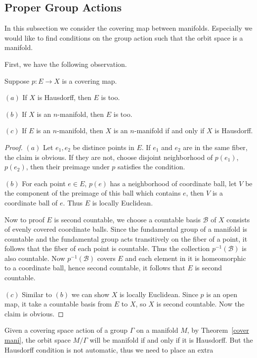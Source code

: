 \subsection{Proper Group Actions}
In this subsection we consider the covering map between manifolds. Especially 
we would like to find conditions on the group action such that the orbit space 
is a manifold.\par
First, we have the following observation.
\begin{theorem}\label{cover mani}
Suppose $p:E\to X$ is a covering map.
\item[$(a)$]If $X$ is Hausdorff, then $E$ is too.
\item[$(b)$]If $X$ is an $n$-manifold, then $E$ is too.
\item[$(c)$]If $E$ is an $n$-manifold, then $X$ is an $n$-manifold if and only if $X$ is Hausdorff.
\end{theorem}
\begin{proof}
$(a)$ Let $e_1,e_2$ be distince points in $E$. If $e_1$ and $e_2$ are in the same fiber, the claim is obvious. If they are not, choose disjoint neighborhood of $p(e_1)$, $p(e_2)$, then their preimage under $p$ satisfies the condition.\par
$(b)$ For each point $e\in E$, $p(e)$ has a neighborhood of coordinate ball, let $V$ be the component of the preimage of this ball which contains $e$, then $V$ is a coordinate ball of $e$. Thus $E$ is locally Euclidean.\par 
Now to proof $E$ is second countable, we choose a countable basis $\mathcal{B}$ of $X$ consists of evenly covered coordinate balls. Since the fundamental group of a manifold is countable and the fundamental group acts transitively on the fiber of a point, it follows that the fiber of each point is countable. Thus the collection $p^{-1}(\mathcal{B})$ is also countable. Now $p^{-1}(\mathcal{B})$ covers $E$ and each element in it is homeomorphic to a coordinate ball, hence second countable, it follows that $E$ is second countable.\par
$(c)$ Similar to $(b)$ we can show $X$ is locally Euclidean. Since $p$ is an open map, it take a countable basis from $E$ to $X$, so $X$ is second countable. Now the claim is obvious.
\end{proof}
Given a covering space action of a group $\Gamma$ on a manifold $M$, by 
Theorem~\ref{cover mani}, the orbit space $M/\Gamma$ will be manifold if and only if it is 
Hausdorff. But the Hausdorff condition is not automatic, thus we need to place an extra 
